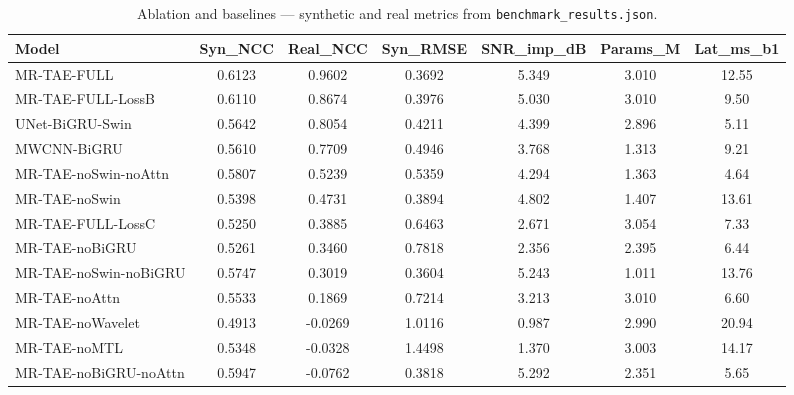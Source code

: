 \begin{table}[t]
\centering
\footnotesize
\caption{Ablation and baselines — synthetic and real metrics from \texttt{benchmark\_results.json}.}
\label{tab:ablation}
\begin{tabular}{lcccccc}
\hline
Model & Syn\_NCC & Real\_NCC & Syn\_RMSE & SNR\_imp\_dB & Params\_M & Lat\_ms\_b1 \\
\hline
MR-TAE-FULL & 0.6123 & 0.9602 & 0.3692 & 5.349 & 3.010 & 12.55 \\
MR-TAE-FULL-LossB & 0.6110 & 0.8674 & 0.3976 & 5.030 & 3.010 & 9.50 \\
UNet-BiGRU-Swin & 0.5642 & 0.8054 & 0.4211 & 4.399 & 2.896 & 5.11 \\
MWCNN-BiGRU & 0.5610 & 0.7709 & 0.4946 & 3.768 & 1.313 & 9.21 \\
MR-TAE-noSwin-noAttn & 0.5807 & 0.5239 & 0.5359 & 4.294 & 1.363 & 4.64 \\
MR-TAE-noSwin & 0.5398 & 0.4731 & 0.3894 & 4.802 & 1.407 & 13.61 \\
MR-TAE-FULL-LossC & 0.5250 & 0.3885 & 0.6463 & 2.671 & 3.054 & 7.33 \\
MR-TAE-noBiGRU & 0.5261 & 0.3460 & 0.7818 & 2.356 & 2.395 & 6.44 \\
MR-TAE-noSwin-noBiGRU & 0.5747 & 0.3019 & 0.3604 & 5.243 & 1.011 & 13.76 \\
MR-TAE-noAttn & 0.5533 & 0.1869 & 0.7214 & 3.213 & 3.010 & 6.60 \\
MR-TAE-noWavelet & 0.4913 & -0.0269 & 1.0116 & 0.987 & 2.990 & 20.94 \\
MR-TAE-noMTL & 0.5348 & -0.0328 & 1.4498 & 1.370 & 3.003 & 14.17 \\
MR-TAE-noBiGRU-noAttn & 0.5947 & -0.0762 & 0.3818 & 5.292 & 2.351 & 5.65 \\
\hline
\end{tabular}
\end{table}
